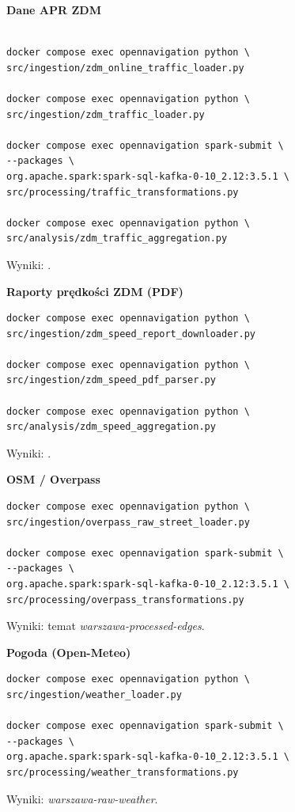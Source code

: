 \documentclass[12pt]{article}
\begin{document}
\par\medskip
\textbf{Dane APR ZDM}
\begin{tcolorbox}
\begin{verbatim}

docker compose exec opennavigation python \
src/ingestion/zdm_online_traffic_loader.py

docker compose exec opennavigation python \
src/ingestion/zdm_traffic_loader.py

docker compose exec opennavigation spark-submit \
--packages \
org.apache.spark:spark-sql-kafka-0-10_2.12:3.5.1 \
src/processing/traffic_transformations.py

docker compose exec opennavigation python \
src/analysis/zdm_traffic_aggregation.py
\end{verbatim}
\end{tcolorbox}
Wyniki: .

\par\medskip
\textbf{Raporty prędkości ZDM (PDF)}
\begin{tcolorbox}
\begin{verbatim}
docker compose exec opennavigation python \
src/ingestion/zdm_speed_report_downloader.py

docker compose exec opennavigation python \
src/ingestion/zdm_speed_pdf_parser.py

docker compose exec opennavigation python \
src/analysis/zdm_speed_aggregation.py
\end{verbatim}
\end{tcolorbox}
Wyniki: .

\par\medskip
\newpage
\textbf{OSM / Overpass}
\begin{tcolorbox}
\begin{verbatim}
docker compose exec opennavigation python \
src/ingestion/overpass_raw_street_loader.py

docker compose exec opennavigation spark-submit \
--packages \
org.apache.spark:spark-sql-kafka-0-10_2.12:3.5.1 \
src/processing/overpass_transformations.py
\end{verbatim}
\end{tcolorbox}
Wyniki: temat \textit{warszawa-processed-edges}.

\par\medskip
\textbf{Pogoda (Open-Meteo)}
\begin{tcolorbox}
\begin{verbatim}
docker compose exec opennavigation python \
src/ingestion/weather_loader.py

docker compose exec opennavigation spark-submit \
--packages \
org.apache.spark:spark-sql-kafka-0-10_2.12:3.5.1 \
src/processing/weather_transformations.py
\end{verbatim}
\end{tcolorbox}
Wyniki: \textit{warszawa-raw-weather}.
\end{document}
